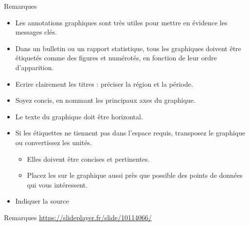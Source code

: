 \documentclass[
  ignorenonframetext,
]{beamer}
\providecommand{\tightlist}{%
  \setlength{\itemsep}{0pt}\setlength{\parskip}{0pt}}
\begin{document}
\begin{frame}{Remarques}
\protect\hypertarget{remarques-1}{}
\begin{itemize}
\tightlist
\item
  Les annotations graphiques sont très utiles pour mettre en évidence
  les messages clés.
\item
  Dans un bulletin ou un rapport statistique, tous les graphiques
  doivent être étiquetés comme des figures et numérotés, en fonction de
  leur ordre d'apparition.
\item
  Ecrire clairement les titres : préciser la région et la période.
\item
  Soyez concis, en nommant les principaux axes du graphique.
\item
  Le texte du graphique doit être horizontal.
\item
  Si les étiquettes ne tiennent pas dans l'espace requis, transposez le
  graphique ou convertissez les unités.

  \begin{itemize}
  \tightlist
  \item
    Elles doivent être concises et pertinentes.
  \item
    Placez les sur le graphique aussi près que possible des points de
    données qui vous intéressent.
  \end{itemize}
\item
  Indiquer la source
\end{itemize}
\end{frame}

\begin{frame}{Remarques}
\protect\hypertarget{remarques-2}{}
\url{https://slideplayer.fr/slide/10114066/}
\end{frame}
\end{document}
